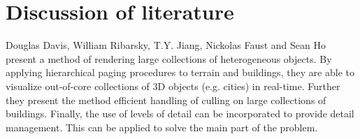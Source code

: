 \chapter{Discussion of literature}
\label{chap:DiscussionOfLiterature}
Douglas Davis, William Ribarsky, T.Y. Jiang, Nickolas Faust and Sean Ho \cite{Davis} present a method of rendering large collections of heterogeneous objects. By applying hierarchical paging procedures to terrain and buildings, they are able to visualize out-of-core collections of 3D objects (e.g. cities) in real-time.  Further they present the method efficient handling of culling on large collections of buildings. Finally, the use of levels of detail can be incorporated to provide detail management. This can be applied to solve the main part of the problem. 